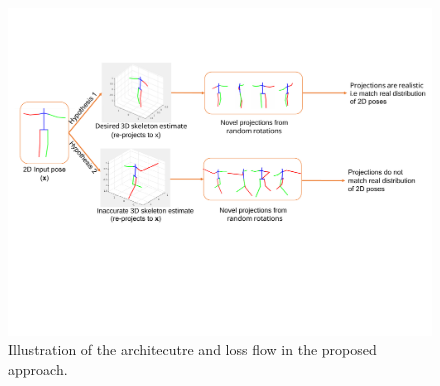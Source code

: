 \begin{figure}[h]
    \centering
    \includegraphics[width=\textwidth]{figures/h36_viz/novel_view_contraint.pdf}
    \caption{Illustration of the architecutre and loss flow in the proposed approach. }
    \label{fig:novel_view_constraint}
\end{figure}

